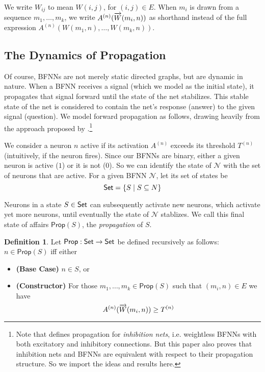 \documentclass[letterpaper]{article}
\newcommand{\Set}{\mbox{\sf Set}}
\theoremstyle{definition}
\newtheorem{definition}{Definition}
\newcommand{\set}[1]{\{ #1 \}}
\newcommand{\Prop}{\textsf{Prop}}
\newcommand{\Net}{\mathcal{N}}
\begin{document}
We write $W_{ij}$ to mean $W(i,j)$, for ${(i, j) \in E}$.  When $m_i$ is drawn from a sequence ${m_1, \ldots, m_k}$, we write ${A^{(n)}(\smash{\overrightarrow{W}}(m_i, n))}$ as shorthand instead of the full expression $A^{(n)}(W(m_1, n), \ldots, W(m_k, n))$.


\subsection{The Dynamics of Propagation}

Of course, BFNNs are not merely static directed graphs, but are dynamic in nature.  When a BFNN receives a signal (which we model as the initial state), it propagates that signal forward until the state of the net stabilizes.  This stable state of the net is considered to contain the net's response (answer) to the given signal (question).  We model forward propagation as follows, drawing heavily from the approach proposed by \cite{leitgeb2001nonmonotonic}.\footnote{Note that \cite{leitgeb2001nonmonotonic} defines propagation for \emph{inhibition nets}, i.e. weightless BFNNs with both excitatory and inhibitory connections.  But this paper also proves that inhibition nets and BFNNs are equivalent with respect to their propagation structure.   So we import the ideas and results here.}  

We consider a neuron $n$ active if its activation $A^{(n)}$ exceeds its threshold $T^{(n)}$ (intuitively, if the neuron fires).  Since our BFNNs are binary, either a given neuron is active ($1$) or it is not ($0$).  So we can identify the state of $\Net$ with the set of neurons that are active.  For a given BFNN $\Net$, let its set of states be
\[
    \Set = \set{S \mid S \subseteq N}
\]

Neurons in a state $S \in \Set$ can subsequently activate new neurons, which activate yet more neurons, until eventually the state of $\Net$ stablizes.  We call this final state of affairs $\Prop(S)$, the \emph{propagation} of $S$.

\begin{definition}
Let $\Prop : \Set \to \Set$ be defined recursively as follows:  $n \in \Prop(S)$ iff either
\begin{itemize}
    \item[] \textbf{(Base Case)} $n \in S$, or
    \item[] \textbf{(Constructor)} For those $m_1, \ldots, m_k \in \Prop(S)$ such that $(m_i, n) \in E$ we have
    \[
    A^{(n)}(\smash{\overrightarrow{W}}(m_i, n)) \geq T^{(n)}
    \]
\end{itemize}
\end{definition}
\end{document}
